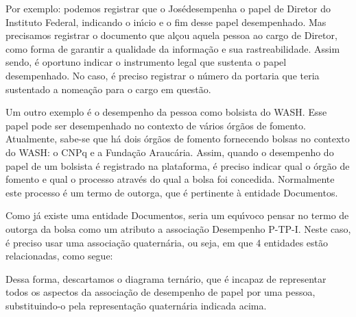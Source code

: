 \documentclass[
12pt,		%
openright,	%
twoside,  %
a4paper,			%
chapter=TITLE,		%
english,			%
french,				%
spanish,			%
brazil				%
]{USPSC-classe/USPSC}
\begin{document}
Por exemplo: podemos registrar que o \textquotedbl Jos\'e\textquotedbl  desempenha o papel de Diretor do Instituto Federal, indicando o in\'{\i}cio e o fim desse papel desempenhado. Mas precisamos registrar o documento que al\c{c}ou aquela pessoa ao cargo de Diretor, como forma de garantir a qualidade da informa\c{c}\~ao e sua rastreabilidade. Assim sendo, \'e oportuno indicar o instrumento legal que sustenta o papel desempenhado. No caso, \'e preciso registrar o n\'umero da portaria que teria sustentado a nomea\c{c}\~ao para o cargo em quest\~ao.




Um outro exemplo \'e o desempenho da pessoa como bolsista do WASH. Esse papel pode ser desempenhado no contexto de v\'arios \'org\~aos de fomento. Atualmente, sabe-se que h\'a dois \'org\~aos de fomento fornecendo bolsas no contexto do WASH: o CNPq e a Funda\c{c}\~ao Arauc\'aria. Assim, quando o desempenho do papel de um bolsista \'e registrado na plataforma, \'e preciso indicar qual o \'org\~ao de fomento e qual o processo atrav\'es do qual a bolsa foi concedida. Normalmente este processo \'e um termo de outorga, que \'e pertinente \`a entidade \textquotedbl Documentos\textquotedbl .




Como j\'a existe uma entidade \textquotedbl Documentos\textquotedbl , seria um equ\'{\i}voco pensar no termo de outorga da bolsa como um atributo a associa\c{c}\~ao \textquotedbl Desempenho P-TP-I\textquotedbl . Neste caso, \'e preciso usar uma associa\c{c}\~ao quatern\'aria, ou seja, em que 4 entidades est\~ao relacionadas, como segue:






Dessa forma, descartamos o diagrama tern\'ario, que \'e incapaz de representar todos os aspectos da associa\c{c}\~ao de desempenho de papel por uma pessoa, substituindo-o pela representa\c{c}\~ao quatern\'aria indicada acima.
\end{document}

